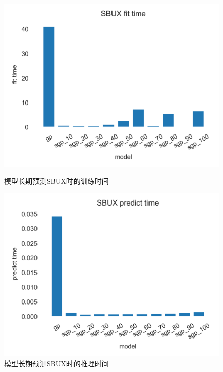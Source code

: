 \begin{figure}[!htbp]
    \centering
    \begin{minipage}[t]{0.49\textwidth}
    \centering
    \includegraphics[width=\textwidth]{images/lab1/SBUX_fit_time.png}
    \caption{模型长期预测SBUX时的训练时间}\label{1SBUXfittime}
    \end{minipage}
    \begin{minipage}[t]{0.49\textwidth}
    \centering
    \includegraphics[width=\textwidth]{images/lab1/SBUX_predict_time.png}
    \caption{模型长期预测SBUX时的推理时间}\label{1SBUXpredicttime}
    \end{minipage}
\end{figure}

